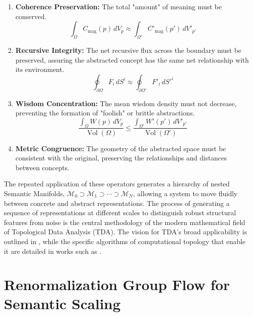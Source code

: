 \begin{enumerate}
    \item \textbf{Coherence Preservation:} The total "amount" of meaning must be conserved.
    \begin{equation}
    \int_{\Omega} C_{\text{mag}}(p) \, dV_p \approx \int_{\Omega'} C'_{\text{mag}}(p') \, dV'_{p'}
    \end{equation}
    \item \textbf{Recursive Integrity:} The net recursive flux across the boundary must be preserved, assuring the abstracted concept has the same net relationship with its environment.
    \begin{equation}
    \oint_{\partial \Omega} F_i \, dS^i \approx \oint_{\partial \Omega'} F'_i \, dS'^i
    \end{equation}
    \item \textbf{Wisdom Concentration:} The mean wisdom density must not decrease, preventing the formation of "foolish" or brittle abstractions.
    \begin{equation}
    \frac{\int_{\Omega} W(p) \, dV_p}{\operatorname{Vol}(\Omega)} \leq \frac{\int_{\Omega'} W'(p') \, dV'_{p'}}{\operatorname{Vol}(\Omega')}
    \end{equation}
    \item \textbf{Metric Congruence:} The geometry of the abstracted space must be consistent with the original, preserving the relationships and distances between concepts.
\end{enumerate}

The repeated application of these operators generates a hierarchy of nested Semantic Manifolds, \(\mathcal{M}_0 \supset \mathcal{M}_1 \supset \cdots \supset \mathcal{M}_N\), allowing a system to move fluidly between concrete and abstract representations. The process of generating a sequence of representations at different scales to distinguish robust structural features from noise is the central methodology of the modern mathematical field of Topological Data Analysis (TDA). The vision for TDA's broad applicability is outlined in \textcite{Carlsson2009}, while the specific algorithms of computational topology that enable it are detailed in works such as \textcite{EdelsbrunnerHarer2010}.


\section{Renormalization Group Flow for Semantic Scaling}
\label{sec:renormalization_group_flow_for_semantic_scaling}

